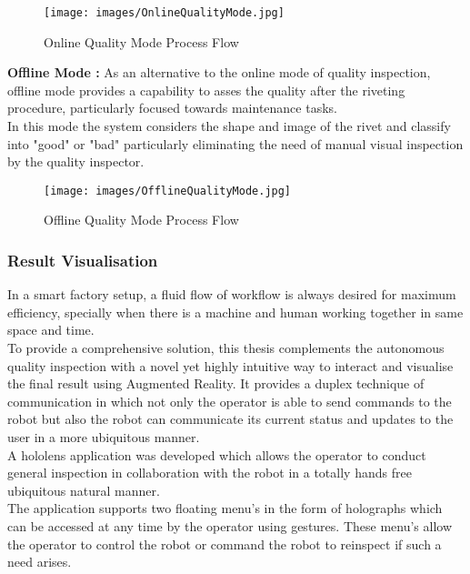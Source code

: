\documentclass{article}
\begin{document}
\begin{figure}[H]
    \centering
    \texttt{[image: images/OnlineQualityMode.jpg]}
    \caption{Online Quality Mode Process Flow}
    \label{fig:OnlineQualityModeProcessFlow}
\end{figure}



\textbf{Offline Mode :} As an alternative to the online mode of quality inspection, offline mode provides a capability to asses the quality after the riveting procedure, particularly focused towards maintenance tasks.\\ 
In this mode the system considers the shape and image of the rivet and classify into "good" or "bad" particularly eliminating the need of manual visual inspection by the quality inspector.

\begin{figure}[H]
    \centering
    \texttt{[image: images/OfflineQualityMode.jpg]}
    \caption{Offline Quality Mode Process Flow}
    \label{fig:OfflineQualityModeProcessFlow}
\end{figure}

\subsubsection{Result Visualisation}

In a smart factory setup, a fluid flow of workflow is always desired for maximum efficiency, specially when there is a machine and human working together in same space and time.\\

To provide a comprehensive solution, this thesis complements the autonomous quality inspection with a  novel yet highly intuitive way to interact and visualise the final result using Augmented Reality. It provides a duplex technique of communication in which not only the operator is able to send commands to the robot but also the robot can communicate its current status and updates to the user in a more ubiquitous manner.\\

A hololens application was developed which allows the operator to conduct general inspection in collaboration with the robot in a totally hands free ubiquitous natural manner.\\

The application supports two floating menu's in the form of holographs which can be accessed at any time by the operator using gestures. These menu's allow the operator to control the robot or command the robot to reinspect if such a need arises.\\ 
\end{document}
